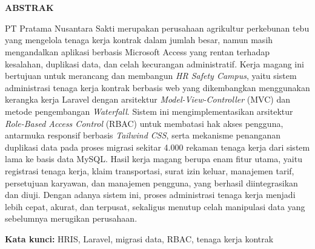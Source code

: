 \chapter*{\Judul}
\singlespacing
\begin{center}
    
    \vspace{-4em}
    
    \penulis
    
	\bigskip
    
    \textbf{ABSTRAK}
    
\end{center}


\vspace*{0.2cm}
{
	\setlength{\parindent}{0pt}

	\bigskip
	\bigskip

PT Pratama Nusantara Sakti merupakan perusahaan agrikultur perkebunan tebu yang
mengelola tenaga kerja kontrak dalam jumlah besar, namun masih mengandalkan
aplikasi berbasis Microsoft Access yang rentan terhadap kesalahan, duplikasi
data, dan celah kecurangan administratif. Kerja magang ini bertujuan untuk
merancang dan membangun \textit{HR Safety Campus}, yaitu sistem administrasi
tenaga kerja kontrak berbasis web yang dikembangkan menggunakan kerangka kerja
Laravel dengan arsitektur \textit{Model-View-Controller} (MVC) dan metode
pengembangan \textit{Waterfall}. Sistem ini mengimplementasikan arsitektur
\textit{Role-Based Access Control} (RBAC) untuk membatasi hak akses pengguna,
antarmuka responsif berbasis \textit{Tailwind CSS}, serta mekanisme penanganan
duplikasi data pada proses migrasi sekitar 4.000 rekaman tenaga kerja dari sistem
lama ke basis data MySQL. Hasil kerja magang berupa enam fitur utama, yaitu
registrasi tenaga kerja, klaim transportasi, surat izin keluar, manajemen tarif,
persetujuan karyawan, dan manajemen pengguna, yang berhasil diintegrasikan dan
diuji. Dengan adanya sistem ini, proses administrasi tenaga kerja menjadi lebih
cepat, akurat, dan terpusat, sekaligus menutup celah manipulasi data yang
sebelumnya merugikan perusahaan.
	\bigskip
 
	\textbf{Kata kunci:} HRIS, Laravel, migrasi data, RBAC, tenaga kerja kontrak
} 

\onehalfspacing
